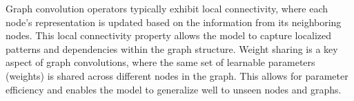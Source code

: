 Graph convolution operators typically exhibit local connectivity, where each node's representation is updated based on the information from its neighboring nodes.
This local connectivity property allows the model to capture localized patterns and dependencies within the graph structure. Weight sharing is a key aspect of graph convolutions, where the same set of learnable parameters (weights) is shared across different nodes in the graph. This allows for parameter efficiency and enables the model to generalize well to unseen nodes and graphs. 

